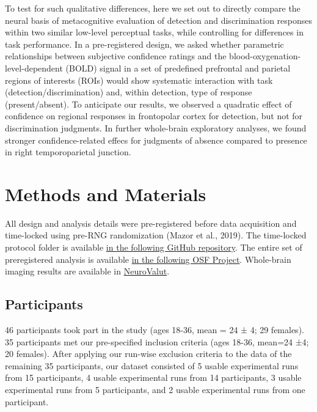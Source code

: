 \documentclass[12pt,twoside]{reedthesis}
\begin{document}
To test for such qualitative differences, here we set out to directly compare the neural basis of metacognitive evaluation of detection and discrimination responses within two similar low-level perceptual tasks, while controlling for differences in task performance. In a pre-registered design, we asked whether parametric relationships between subjective confidence ratings and the blood-oxygenation-level-dependent (BOLD) signal in a set of predefined prefrontal and parietal regions of interests (ROIs) would show systematic interaction with task (detection/discrimination) and, within detection, type of response (present/absent). To anticipate our results, we observed a quadratic effect of confidence on regional responses in frontopolar cortex for detection, but not for discrimination judgments. In further whole-brain exploratory analyses, we found stronger confidence-related effecs for judgments of absence compared to presence in right temporoparietal junction.

\hypertarget{methods-and-materials}{%
\section{Methods and Materials}\label{methods-and-materials}}

All design and analysis details were pre-registered before data acquisition and time-locked using pre-RNG randomization (Mazor et al., 2019). The time-locked protocol folder is available \href{https://www.github.com/matanmazor/detectionVsDiscrimination_fMRI}{in the following GitHub repository}. The entire set of preregistered analysis is available \href{https://www.osf.io/98mv4}{in the following OSF Project}. Whole-brain imaging results are available in \href{https://neurovault.org/collections/VVLPQBWK/}{NeuroValut}.

\hypertarget{participants-4}{%
\subsection{Participants}\label{participants-4}}

46 participants took part in the study (ages 18-36, mean = 24 ± 4; 29 females). 35 participants met our pre-specified inclusion criteria (ages 18-36, mean=24 ±4; 20 females). After applying our run-wise exclusion criteria to the data of the remaining 35 participants, our dataset consisted of 5 usable experimental runs from 15 participants, 4 usable experimental runs from 14 participants, 3 usable experimental runs from 5 participants, and 2 usable experimental runs from one participant.
\end{document}
